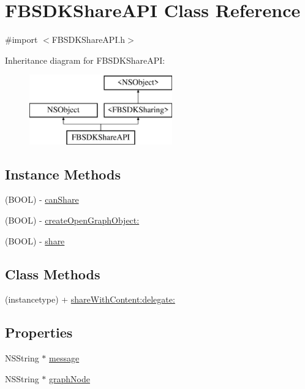 \hypertarget{interface_f_b_s_d_k_share_a_p_i}{}\section{F\+B\+S\+D\+K\+Share\+A\+P\+I Class Reference}
\label{interface_f_b_s_d_k_share_a_p_i}


{\ttfamily \#import $<$F\+B\+S\+D\+K\+Share\+A\+P\+I.\+h$>$}

Inheritance diagram for F\+B\+S\+D\+K\+Share\+A\+P\+I\+:\begin{figure}[H]
\begin{center}
\leavevmode
\includegraphics[height=3.000000cm]{interface_f_b_s_d_k_share_a_p_i}
\end{center}
\end{figure}
\subsection*{Instance Methods}
\begin{DoxyCompactItemize}
\item 
(B\+O\+O\+L) -\/ \hyperlink{interface_f_b_s_d_k_share_a_p_i_a785150525008f6d86334ec4fb0bf51a9}{can\+Share}
\item 
(B\+O\+O\+L) -\/ \hyperlink{interface_f_b_s_d_k_share_a_p_i_a228e7a9168a9c48e19af98236bba89e4}{create\+Open\+Graph\+Object\+:}
\item 
(B\+O\+O\+L) -\/ \hyperlink{interface_f_b_s_d_k_share_a_p_i_ab04f5ec10df40c652e6f3720f50027bd}{share}
\end{DoxyCompactItemize}
\subsection*{Class Methods}
\begin{DoxyCompactItemize}
\item 
(instancetype) + \hyperlink{interface_f_b_s_d_k_share_a_p_i_a97dd7db2536228ae3015bb9f4a0e84fe}{share\+With\+Content\+:delegate\+:}
\end{DoxyCompactItemize}
\subsection*{Properties}
\begin{DoxyCompactItemize}
\item 
N\+S\+String $\ast$ \hyperlink{interface_f_b_s_d_k_share_a_p_i_a5ffe34ad98a2a26b3c347600aea194ca}{message}
\item 
N\+S\+String $\ast$ \hyperlink{interface_f_b_s_d_k_share_a_p_i_acbaa236ab85ea258d5432560b7a2b8e8}{graph\+Node}
\end{DoxyCompactItemize}


